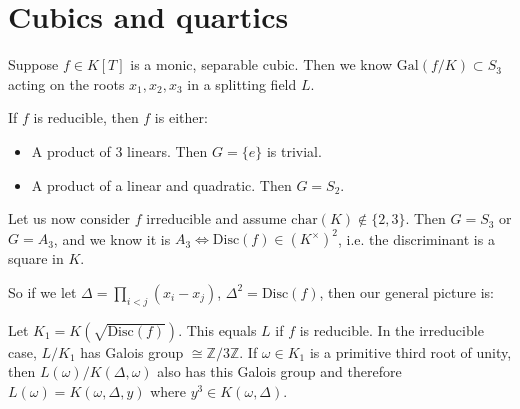 \documentclass{article}
\theoremstyle{definition}
\begin{document}
\section{Cubics and quartics}

Suppose $f \in K[T]$ is a monic, separable cubic. Then we know $\text{Gal}(f/K) \subset S_3$ acting on the roots $x_1,x_2,x_3$ in a splitting field $L$.
\vspace{1mm}

If $f$ is reducible, then $f$ is either:
\begin{itemize}
    \item A product of 3 linears. Then $G = \{e\}$ is trivial.
    \item A product of a linear and quadratic. Then $G=S_2$.
\end{itemize}
Let us now consider $f$ irreducible and assume $\text{char}(K) \not\in \{2,3\}$. Then $G=S_3$ or $G=A_3$, and we know it is $A_3 \iff \text{Disc}(f) \in (K^\times)^2$, i.e. the discriminant is a square in $K$.
\vspace{1mm}

So if we let $\Delta=\prod_{i<j}^{} (x_i-x_j)$, $\Delta^2=\text{Disc}(f)$, then our general picture is:

\begin{figure}[H]
    \centering
\end{figure}

Let $K_1 = K(\sqrt{\text{Disc}(f)})$. This equals $L$ if $f$ is reducible. In the irreducible case, $L/K_1$ has Galois group $\cong \mathbb{Z}/3\mathbb{Z}$. If $\omega \in K_1$ is a primitive third root of unity, then $L(\omega)/K(\Delta,\omega)$ also has this Galois group and therefore $L(\omega) = K(\omega,\Delta,y)$ where $y^3 \in K(\omega,\Delta)$.
\vspace{1mm}
\end{document}
